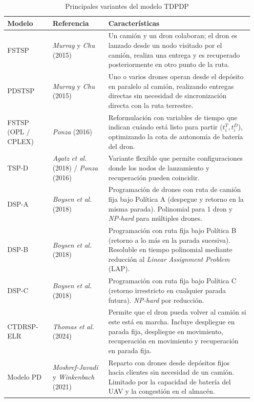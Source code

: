 \begin{table}[H]
\centering
\scriptsize
\setlength{\tabcolsep}{3.5pt}
\caption{Principales variantes del modelo TDPDP}
\label{tab:variantes-tdpdp}
\begin{tabular}{p{2.3cm}p{3.4cm}p{7.9cm}}
\hline
\textbf{Modelo} & \textbf{Referencia} & \textbf{Características} \\
\hline
FSTSP & \textit{Murray} y \textit{Chu} (2015) \cite{Murray2015Flying} & Un camión y un dron colaboran; el dron es lanzado desde un nodo visitado por el camión, realiza una entrega y es recuperado posteriormente en otro punto de la ruta. \\
\hline
PDSTSP & \textit{Murray} y \textit{Chu} (2015) \cite{Murray2015Flying} & Uno o varios drones operan desde el depósito en paralelo al camión, realizando entregas directas sin necesidad de sincronización directa con la ruta terrestre. \\
\hline
FSTSP (OPL / CPLEX) & \textit{Ponza} (2016) \cite{ponza2016optimization} & Reformulación con variables de tiempo que indican cuándo está listo para partir ($t^T_i, t^D_i$), optimizando la cota de autonomía de batería del dron. \\
\hline
TSP-D & \textit{Agatz et al.} (2018) / \textit{Ponza} (2016) \cite{ponza2016optimization} & Variante flexible que permite configuraciones donde los nodos de lanzamiento y recuperación pueden coincidir. \\
\hline
DSP-A & \textit{Boysen et al.} (2018) \cite{boysen2018drone} & Programación de drones con ruta de camión fija bajo Política A (despegue y retorno en la misma parada). Polinomial para 1 dron y \textit{NP-hard} para múltiples drones. \\
\hline
DSP-B & \textit{Boysen et al.} (2018) \cite{boysen2018drone} & Programación con ruta fija bajo Política B (retorno a lo más en la parada sucesiva). Resoluble en tiempo polinomial mediante reducción al \textit{Linear Assignment Problem} (LAP). \\
\hline
DSP-C & \textit{Boysen et al.} (2018) \cite{boysen2018drone} & Programación con ruta fija bajo Política C (retorno irrestricto en cualquier parada futura). \textit{NP-hard} por reducción. \\
\hline
CTDRSP-ELR & \textit{Thomas et al.} (2024) \cite{thomas2024collaborative} & Permite que el dron pueda volver al camión si este está en marcha. Incluye despliegue en parada fija, despliegue en movimiento, recuperación en movimiento y recuperación en parada fija. \\
\hline
Modelo PD & \textit{Moshref-Javadi} y \textit{Winkenbach} (2021) \cite{moshrefjavadi2021applications} & Reparto con drones desde depósitos fijos hacia clientes sin necesidad de un camión. Limitado por la capacidad de batería del UAV y la congestión en el almacén. \\
\hline
\end{tabular}
\end{table}

